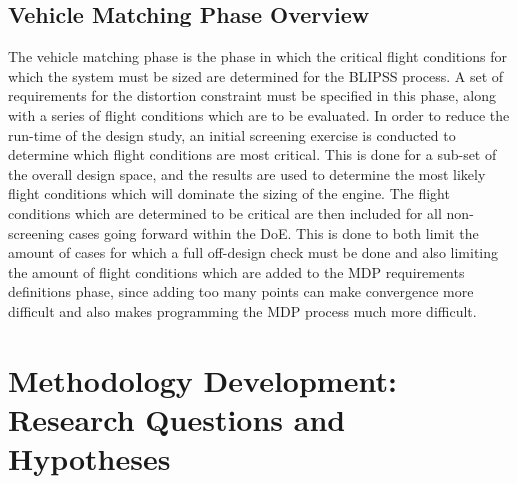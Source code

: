 		\subsection{Vehicle Matching Phase Overview}
			The vehicle matching phase is the phase in which the critical flight conditions for which the system must be sized are determined for the BLIPSS process.  A set of requirements for the distortion constraint must be specified in this phase, along with a series of flight conditions which are to be evaluated.  In order to reduce the run-time of the design study, an initial screening exercise is conducted to determine which flight conditions are most critical.  This is done for a sub-set of the overall design space, and the results are used to determine the most likely flight conditions which will dominate the sizing of the engine.  The flight conditions which are determined to be critical are then included for all non-screening cases going forward within the DoE.  This is done to both limit the amount of cases for which a full off-design check must be done and also limiting the amount of flight conditions which are added to the MDP requirements definitions phase, since adding too many points can make convergence more difficult and also makes programming the MDP process much more difficult.
	\section{Methodology Development:  Research Questions and Hypotheses}		
